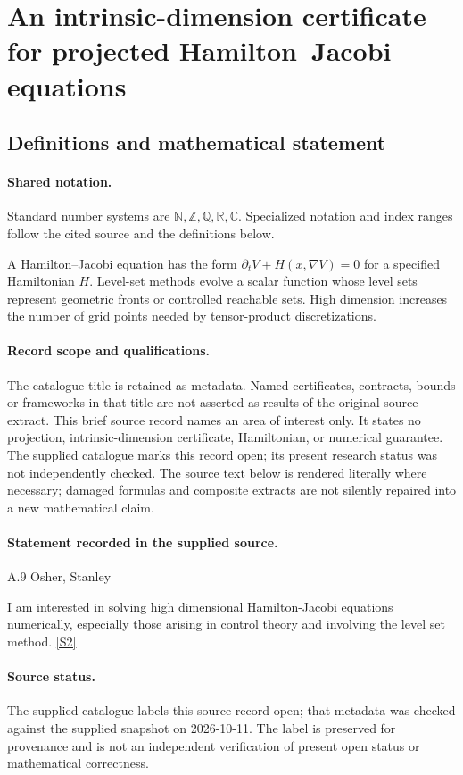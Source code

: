 \documentclass[11pt]{article}
\newcommand{\sref}[2]{\hyperlink{source:#1:#2}{[S#2]}}
\begin{document}
\section{An intrinsic-dimension certificate for projected Hamilton--Jacobi equations}\label{statement}

\subsection{Definitions and mathematical statement}

\paragraph{Shared notation.}Standard number systems are $\mathbb N,\mathbb Z,\mathbb Q,\mathbb R,\mathbb C$. Specialized notation and index ranges follow the cited source and the definitions below.


A Hamilton--Jacobi equation has the form $\partial_tV+H(x,\nabla V)=0$ for a specified Hamiltonian $H$. Level-set methods evolve a scalar function whose level sets represent geometric fronts or controlled reachable sets. High dimension increases the number of grid points needed by tensor-product discretizations.
\paragraph{Record scope and qualifications.}
The catalogue title is retained as metadata. Named certificates, contracts, bounds or frameworks in that title are not asserted as results of the original source extract.
This brief source record names an area of interest only. It states no projection, intrinsic-dimension certificate, Hamiltonian, or numerical guarantee. The supplied catalogue marks this record open; its present research status was not independently checked.
The source text below is rendered literally where necessary; damaged formulas and composite extracts are not silently repaired into a new mathematical claim.
\paragraph{Statement recorded in the supplied source.}
A.9 Osher, Stanley

I am interested in solving high dimensional Hamilton-Jacobi equations numerically, especially those arising in control theory and involving the level set method. \sref{statement}{2}
\paragraph{Source status.}
The supplied catalogue labels this source record open; that metadata was checked against the supplied snapshot on 2026-10-11. The label is preserved for provenance and is not an independent verification of present open status or mathematical correctness.
\end{document}
